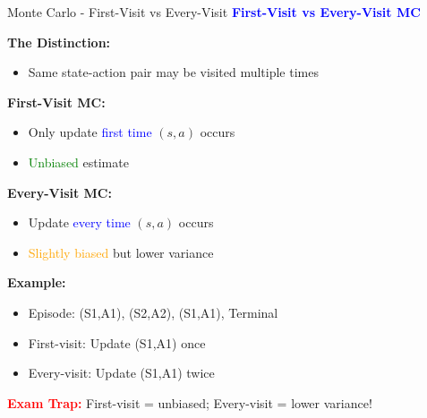 \documentclass[8pt]{beamer}
\begin{document}
	\begin{frame}{Monte Carlo - First-Visit vs Every-Visit}
		\fontsize{6.5}{7.5}\selectfont
		\textcolor{blue}{\textbf{First-Visit vs Every-Visit MC}}
		
		\textbf{The Distinction:}
		\begin{itemize}
			\item Same state-action pair may be visited multiple times
		\end{itemize}
		
		\textbf{First-Visit MC:}
		\begin{itemize}
			\item Only update \textcolor{blue}{first time} $(s,a)$ occurs
			\item \textcolor{green}{Unbiased} estimate
		\end{itemize}
		
		\textbf{Every-Visit MC:}
		\begin{itemize}
			\item Update \textcolor{blue}{every time} $(s,a)$ occurs
			\item \textcolor{orange}{Slightly biased} but lower variance
		\end{itemize}
		
		\textbf{Example:}
		\begin{itemize}
			\item Episode: (S1,A1), (S2,A2), (S1,A1), Terminal
			\item First-visit: Update (S1,A1) once
			\item Every-visit: Update (S1,A1) twice
		\end{itemize}
		
		\textcolor{red}{\textbf{Exam Trap:}} First-visit = unbiased; Every-visit = lower variance!
	\end{frame}
	
\end{document}
